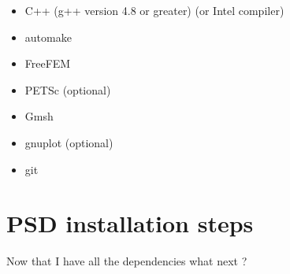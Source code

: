 \documentclass{report}
\begin{document}
\begin{itemize}
\item  {\ttfamily C++}    (g++ version 4.8 or greater) (or Intel compiler)
\item  {\ttfamily automake}
\item  {\ttfamily FreeFEM}
\item  {\ttfamily PETSc}      (optional)
\item  {\ttfamily Gmsh}
\item  {\ttfamily gnuplot}	(optional)
\item  {\ttfamily git}   
\end{itemize}


\section{PSD installation steps \label{sec:psd-install}}
Now that I have all the dependencies what next ?  
\end{document}
